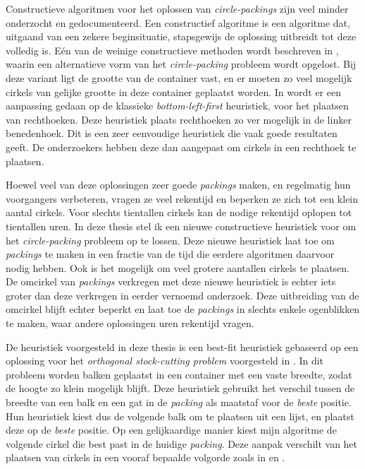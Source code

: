 \documentclass[12pt,a4paper,oneside]{book}
\begin{document}
Constructieve algoritmen voor het oplossen van \textit{circle-packings} zijn veel minder onderzocht en gedocumenteerd.
Een constructief algoritme is een algoritme dat, uitgaand van een zekere beginsituatie, stapsgewijs de oplossing uitbreidt tot deze volledig is.
Eén van de weinige constructieve methoden wordt beschreven in \cite{akeb2006basic}, waarin een alternatieve vorm van het \textit{circle-packing} probleem wordt opgelost. Bij deze variant ligt de grootte van de container vast, en er moeten zo veel mogelijk cirkels van gelijke grootte in deze container geplaatst worden.
In \cite{hifi2004approximate} wordt er een aanpassing gedaan op de klassieke \textit{bottom-left-first} heuristiek, voor het plaatsen van rechthoeken.
Deze heuristiek plaats rechthoeken zo ver mogelijk in de linker benedenhoek.
Dit is een zeer eenvoudige heuristiek die vaak goede resultaten geeft.
De onderzoekers hebben deze dan aangepast om cirkels in een rechthoek te plaatsen.

Hoewel veel van deze oplossingen zeer goede \textit{packings} maken, en regelmatig hun voorgangers verbeteren, vragen ze veel rekentijd en beperken ze zich tot een klein aantal cirkels.
Voor slechts tientallen cirkels kan de nodige rekentijd oplopen tot tientallen uren.
In deze thesis stel ik een nieuwe constructieve heuristiek voor om het \textit{circle-packing} probleem op te lossen.
Deze nieuwe heuristiek laat toe om \textit{packings} te maken in een fractie van de tijd die eerdere algoritmen daarvoor nodig hebben.
Ook is het mogelijk om veel grotere aantallen cirkels te plaatsen.
De omcirkel van \textit{packings} verkregen met deze nieuwe heuristiek is echter iets groter dan deze verkregen in eerder vernoemd onderzoek.
Deze uitbreiding van de omcirkel blijft echter beperkt en laat toe de \textit{packings} in slechts enkele ogenblikken te maken, waar andere oplossingen uren rekentijd vragen.

De heuristiek voorgesteld in deze thesis is een best-fit heuristiek gebaseerd op een oplossing voor het \textit{orthogonal stock-cutting problem} voorgesteld in \cite{burke2004new}.
In dit probleem worden balken geplaatst in een container met een vaste breedte, zodat de hoogte zo klein mogelijk blijft.
Deze heuristiek gebruikt het verschil tussen de breedte van een balk en een gat in de \textit{packing} als maatstaf voor de \textit{beste} positie.
Hun heuristiek kiest dus de volgende balk om te plaatsen uit een lijst, en plaatst deze op de \textit{beste} positie.
Op een gelijkaardige manier kiest mijn algoritme de volgende cirkel die best past in de huidige \textit{packing}.
Deze aanpak verschilt van het plaatsen van cirkels in een vooraf bepaalde volgorde zoals in \cite{grosso2010} en \cite{jors2011}.
\end{document}
